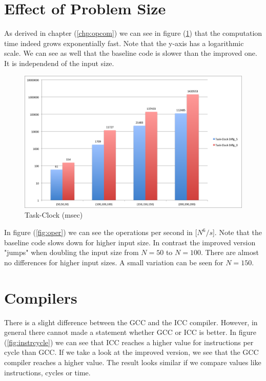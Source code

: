 \documentclass[12pt,a4paper]{article}
\begin{document}
\section{Effect of Problem Size}

As derived in chapter (\ref{chp:opcom}) we can see in figure (\ref{fig:clock}) that the computation time indeed grows exponentially fast. Note that the y-axis has a logarithmic scale. We can see as well that the baseline code is slower than the improved one. It is independend of the input size.

\begin{figure}[h]
	\centering
	\includegraphics[width=1.0\linewidth]{"Benchmark 2/clock"}
	\caption{Task-Clock (msec)}
	\label{fig:clock}
\end{figure}

In figure (\ref{fig:oper}) we can see the operations per second in [$N^6/s$]. Note that the baseline code slows down for higher input size. In contrast the improved version "jumps" when doubling the input size from $N=50$ to $N=100$. There are almost no differences for higher input sizes. A small variation can be seen for $N=150$.

\section{Compilers}

There is a slight difference between the GCC and the ICC compiler. However, in general there cannot made a statement whether GCC or ICC is better. In figure (\ref{fig:instrcycle}) we can see that ICC reaches a higher value for instructions per cycle than GCC. If we take a look at the improved version, we see that the GCC compiler reaches a higher value. The result looks similar if we compare values like instructions, cycles or time.
\end{document}
